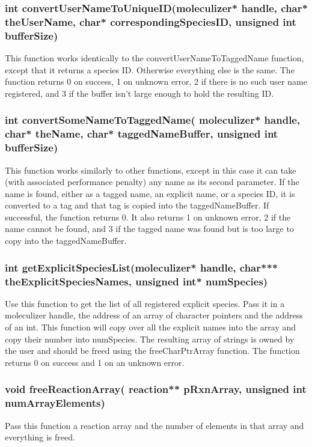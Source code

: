 \subsubsection{int convertUserNameToUniqueID(moleculizer* handle,
  char* theUserName, char* correspondingSpeciesID, unsigned int
  bufferSize)}
This function works identically to the convertUserNameToTaggedName
function, except that it returns a species ID.  Otherwise everything
else is the same.  The function returns 0 on success, 1 on unknown
error, 2 if there is no such user name registered, and 3 if the buffer
isn't large enough to hold the resulting ID.

\subsubsection{int convertSomeNameToTaggedName( moleculizer* handle,
  char* theName, char* taggedNameBuffer, unsigned int bufferSize)}
This function works similarly to other functions, except in this case
it can take (with associated performance penalty) any name as its
second parameter.  If the name is found, either as a tagged name, an
explicit name, or a species ID, it is converted to a tag and that tag
is copied into the taggedNameBuffer.  If successful, the function
returns 0.  It also returns 1 on unknown error, 2 if the name cannot
be found, and 3 if the tagged name was found but is too large to copy
into the taggedNameBuffer.

\subsubsection{int getExplicitSpeciesList(moleculizer* handle, char***
  theExplicitSpeciesNames, unsigned int* numSpecies)}
Use this function to get the list of all registered explicit species.
Pass it in a moleculizer handle, the address of an array of character
pointers and the address of an int.  This function will copy over all
the explicit names into the array and copy their number into
numSpecies.  The resulting array of strings is owned by the user and
should be freed using the freeCharPtrArray function.  The function
returns 0 on success and 1 on an unknown error.  

\subsubsection{void freeReactionArray( reaction** pRxnArray, unsigned
  int numArrayElements)}
Pass this function a reaction array and the number of elements in that
array and everything is freed.  

